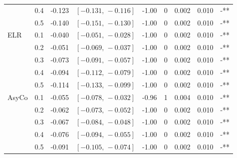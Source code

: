 \begin{small}
\begin{longtable}{llrrrrrrl}
 & 0.4 & -0.123 & $[-0.131,\,-0.116]$ & -1.00 & 0 & 0.002 & 0.010 & -** \\
 & 0.5 & -0.140 & $[-0.151,\,-0.130]$ & -1.00 & 0 & 0.002 & 0.010 & -** \\
ELR & 0.1 & -0.040 & $[-0.051,\,-0.028]$ & -1.00 & 0 & 0.002 & 0.010 & -** \\
 & 0.2 & -0.051 & $[-0.069,\,-0.037]$ & -1.00 & 0 & 0.002 & 0.010 & -** \\
 & 0.3 & -0.073 & $[-0.091,\,-0.057]$ & -1.00 & 0 & 0.002 & 0.010 & -** \\
 & 0.4 & -0.094 & $[-0.112,\,-0.079]$ & -1.00 & 0 & 0.002 & 0.010 & -** \\
 & 0.5 & -0.114 & $[-0.133,\,-0.099]$ & -1.00 & 0 & 0.002 & 0.010 & -** \\
AsyCo & 0.1 & -0.055 & $[-0.078,\,-0.032]$ & -0.96 & 1 & 0.004 & 0.010 & -** \\
 & 0.2 & -0.062 & $[-0.073,\,-0.052]$ & -1.00 & 0 & 0.002 & 0.010 & -** \\
 & 0.3 & -0.067 & $[-0.084,\,-0.048]$ & -1.00 & 0 & 0.002 & 0.010 & -** \\
 & 0.4 & -0.076 & $[-0.094,\,-0.055]$ & -1.00 & 0 & 0.002 & 0.010 & -** \\
 & 0.5 & -0.091 & $[-0.105,\,-0.074]$ & -1.00 & 0 & 0.002 & 0.010 & -** \\
\end{longtable}
\end{small}
